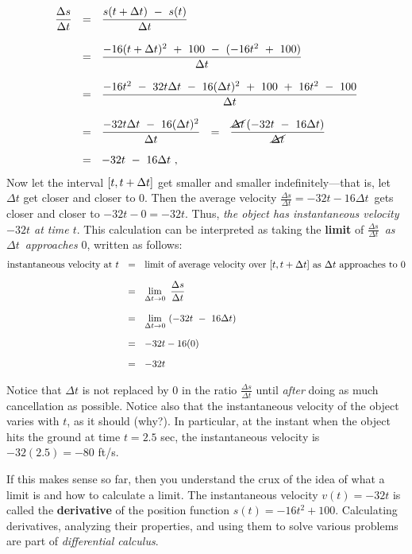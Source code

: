 \begin{align*}
 \dfrac{\Delta s}{\Delta t} ~~&=~~ \dfrac{s(t + \Delta t) ~-~ s(t)}
  {\Delta t}\\[8pt]
  &=~~ \dfrac{-16(t+\Delta t)^2 ~+~ 100 ~-~ (-16t^2 ~+~ 100)}{\Delta t}\\[8pt]
  &=~~ \dfrac{-16t^2 ~-~ 32t\Delta t ~-~ 16(\Delta t)^2 ~+~ 100 ~+~ 16t^2
   ~-~ 100}{\Delta t}\\[8pt]
  &=~~ \dfrac{-32t\Delta t ~-~ 16(\Delta t)^2}{\Delta t}
   ~~=~~ \dfrac{\cancel{\Delta t} \,(-32t ~-~ 16\Delta t)}
          {\cancel{\Delta t}}\\[6pt]
  &=~~ -32t ~-~ 16\Delta t ~,
\end{align*}
Now let the interval $\lbrack t,t+\Delta t \rbrack$ get smaller and
smaller indefinitely---that is, let $\Delta t$ get closer and closer to 0.
Then the average velocity $\frac{\Delta s}{\Delta t} = -32t - 16\Delta t\,$
gets closer and closer to $-32t - 0 = -32t$. Thus, \emph{the object has
instantaneous velocity $-32t$ at time $t$}. This calculation can be
interpreted as taking the \textbf{limit} of
$\frac{\Delta s}{\Delta t}\,$ \emph{as} $\Delta t\,$ \emph{approaches} $0$,
written as follows:
\begin{align*}
 \text{instantaneous velocity at $t$} ~~&=~~
  \text{limit of average velocity over $\lbrack t,t+\Delta t \rbrack$
  as $\Delta t$ approaches to 0}\\[6pt]
  &=~~ \lim_{\Delta t \to 0} ~\frac{\Delta s}{\Delta t}\\[8pt]
  &=~~ \lim_{\Delta t \to 0} ~(-32t ~-~ 16\Delta t)\\[6pt]
  &=~~ -32t - 16(0)\\[6pt]
  &=~~ -32t
\end{align*}

Notice that $\Delta t$ is not replaced by $0$ in the
ratio $\frac{\Delta s}{\Delta t}$ until \emph{after} doing as much cancellation
as possible. Notice also that the instantaneous velocity of the object
varies with $t$, as it should (why?). In particular, at the instant when the
object hits the ground at time $t = 2.5$ sec, the instantaneous velocity is
$-32(2.5) = -80$ ft/s.

If this makes sense so far, then you understand the crux of the idea of what a
limit is and how to calculate a limit. The instantaneous velocity $v(t) = -32t$
is called the \textbf{derivative} of the position function $s(t) =-16t^2 + 100$.
Calculating derivatives, analyzing their properties, and using them to solve
various problems are part of \emph{differential calculus}.

